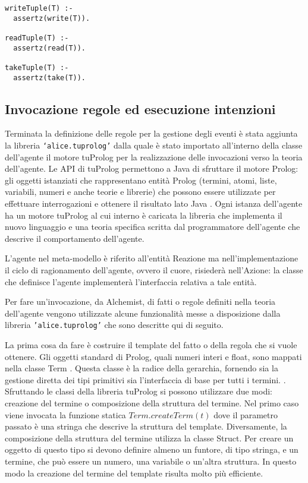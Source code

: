 \switchToProlog{}
\begin{lstlisting}[float,firstnumber=1,label={lst:ImplementazioneRegoleSpatialTuples},caption={Implementazione regole estensione Spatial Tuples}]
writeTuple(T) :-
  assertz(write(T)).

readTuple(T) :-
  assertz(read(T)).

takeTuple(T) :-
  assertz(take(T)).
\end{lstlisting}

\subsection{Invocazione regole ed esecuzione intenzioni}\label{sctn:InvocazioneEsecuzioneIntenzioni}
Terminata la definizione delle regole per la gestione degli eventi è stata aggiunta la libreria \texttt{`alice.tuprolog’} dalla quale è stato importato all'interno della classe dell'agente il motore tuProlog per la realizzazione delle invocazioni verso la teoria dell'agente.
Le API di tuProlog permettono a Java di sfruttare il motore Prolog: gli oggetti istanziati che rappresentano entità Prolog (termini, atomi, liste, variabili, numeri e anche teorie e librerie) che possono essere utilizzate per effettuare interrogazioni e ottenere il risultato lato Java \cite{2p-alpnews2013}.
Ogni istanza dell'agente ha un motore tuProlog al cui interno è caricata la libreria che implementa il nuovo linguaggio e una teoria specifica scritta dal programmatore dell'agente che descrive il comportamento dell'agente.

L'agente nel meta-modello è riferito all'entità Reazione ma nell'implementazione il ciclo di ragionamento dell'agente, ovvero il cuore, risiederà nell'Azione: la classe che definisce l'agente implementerà l'interfaccia relativa a tale entità.

Per fare un'invocazione, da Alchemist, di fatti o regole definiti nella teoria dell'agente vengono utilizzate alcune funzionalità messe a disposizione dalla libreria \texttt{'alice.tuprolog'} che sono descritte qui di seguito.

La prima cosa da fare è costruire il template del fatto o della regola che si vuole ottenere.
Gli oggetti standard di Prolog, quali numeri interi e float, sono mappati nella classe Term \cite{tuPrologLight-weight}. Questa classe è la radice della gerarchia, fornendo sia la gestione diretta dei tipi primitivi sia l'interfaccia di base per tutti i termini. \cite{tuPrologLight-weight}.
Sfruttando le classi della libreria tuProlog si possono utilizzare due modi: creazione del termine o composizione della struttura del termine. Nel primo caso viene invocata la funzione statica $Term.createTerm(t)$ dove il parametro passato è una stringa che descrive la struttura del template. Diversamente, la composizione della struttura del termine utilizza la classe Struct. Per creare un oggetto di questo tipo si devono definire almeno un funtore, di tipo stringa, e un termine, che può essere un numero, una variabile o un'altra struttura. In questo modo la creazione del termine del template risulta molto più efficiente.

